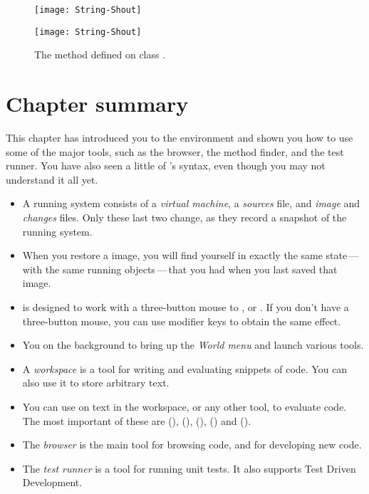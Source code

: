 \documentclass[a4paper,10pt,twoside]{book}
\begin{document}
\begin{figure}[hbt]
\ifluluelse
	{\centerline{\texttt{[image: String-Shout]}}}
	{\centerline{\texttt{[image: String-Shout]}}}
\caption{The  method defined on class .
}
\end{figure}

\section{Chapter summary}
This chapter has introduced you to the \pharo environment and shown you how to use some of the major tools, such as the browser, the method finder, and the test runner.   You have also seen a little of \pharo's syntax, even though you may not understand it all yet.

\begin{itemize}
  \item A running \pharo system consists of a \emph{virtual machine}, a \emph{sources} file, and \emph{image} and \emph{changes} files. Only these last two change, as they record a snapshot of the running system.
  \item When you restore a \pharo image, you will find yourself in exactly the same state\,---\,with the same running objects\,---\,that you had when you last saved that image.
  \item \pharo is designed to work with a three-button mouse to \click, \actclick or \metaclick.  If you don't have a three-button mouse, you can use modifier keys to obtain the same effect.
  \item You \click on the \pharo background to bring up the \emph{World menu} and launch various tools.
  \item A \emph{workspace} is a tool for writing and evaluating snippets of code. You can also use it to store arbitrary text.
  \item You can use  on text in the workspace, or any other tool, to evaluate code. The most important of these are  (),  (),  (),  () and  ().
  \item The \emph{browser} is the main tool for browsing \pharo code, and for developing new code.
  \item The \emph{test runner} is a tool for running unit tests. It also supports Test Driven Development.
\end{itemize}

\ifx\wholebook\relax\else 
   
   
\end{document}

